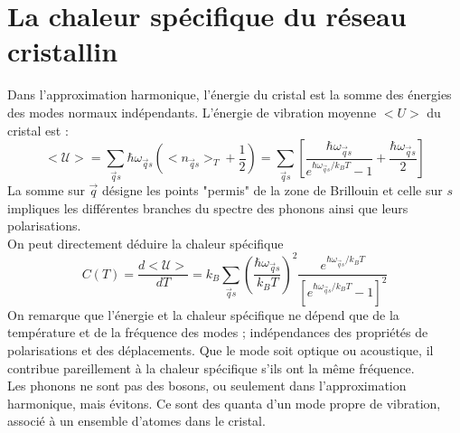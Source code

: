 \section{La chaleur spécifique du réseau cristallin}
Dans l'approximation harmonique, l'énergie du cristal est la somme des énergies 
des modes normaux indépendants. L'énergie de vibration moyenne $<U>$ du cristal 
est :
\begin{equation}
<\mathcal{U}> = \sum_{\vec{q}s} \hbar\omega_{\vec qs}\left(<n_{\vec{q}s}>_T+
\dfrac{1}{2}\right) = \sum_{\vec{q}s} \left[\dfrac{\hbar\omega_{\vec{q}s}}{
e^{\hbar\omega_{\vec qs}/k_BT}-1}+\dfrac{\hbar\omega_{\vec{q}s}}{2}\right]
\end{equation}
La somme sur $\vec{q}$ désigne les points "permis" de la zone de Brillouin et 
celle sur $s$ impliques les différentes branches du spectre des phonons ainsi 
que leurs polarisations.\\
On peut directement déduire la chaleur spécifique
\begin{equation}
C(T) = \dfrac{d<\mathcal{U}>}{dT} = k_B\sum_{\vec{q}s}\left(\dfrac{\hbar 
\omega_{\vec{q}s}}{k_BT}\right)^2\dfrac{e^{\hbar\omega_{\vec{q}s}/k_BT}}{
\left[e^{\hbar\omega_{\vec{q}s}/k_BT}-1\right]^2}
\end{equation}
On remarque que l'énergie et la chaleur spécifique ne dépend que de la 
température et de la fréquence des modes ; indépendances des propriétés de 
polarisations et des déplacements. Que le mode soit optique ou acoustique, 
il contribue pareillement à la chaleur spécifique s'ils ont la même 
fréquence.\\
\danger Les phonons ne sont pas des bosons, ou seulement dans l'approximation 
harmonique, mais évitons. Ce sont des quanta d'un mode propre de vibration, 
associé à un ensemble d'atomes dans le cristal.\newpage

